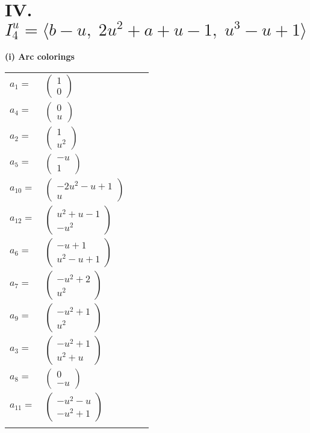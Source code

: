 \documentclass[1p]{elsarticle_modified}
\theoremstyle{definition}
\begin{document}
\centering \section*{IV. $I^u_{4}= \langle b- u,\;2 u^2+a+u-1,\;u^3- u+1 \rangle$}
\flushleft \textbf{(i) Arc colorings}\\
\begin{tabular}{m{7pt} m{180pt} m{7pt} m{180pt} }
\flushright $a_{1}=$&$\begin{pmatrix}1\\0\end{pmatrix}$ \\
\flushright $a_{4}=$&$\begin{pmatrix}0\\u\end{pmatrix}$ \\
\flushright $a_{2}=$&$\begin{pmatrix}1\\u^2\end{pmatrix}$ \\
\flushright $a_{5}=$&$\begin{pmatrix}- u\\1\end{pmatrix}$ \\
\flushright $a_{10}=$&$\begin{pmatrix}-2 u^2- u+1\\u\end{pmatrix}$ \\
\flushright $a_{12}=$&$\begin{pmatrix}u^2+u-1\\- u^2\end{pmatrix}$ \\
\flushright $a_{6}=$&$\begin{pmatrix}- u+1\\u^2- u+1\end{pmatrix}$ \\
\flushright $a_{7}=$&$\begin{pmatrix}- u^2+2\\u^2\end{pmatrix}$ \\
\flushright $a_{9}=$&$\begin{pmatrix}- u^2+1\\u^2\end{pmatrix}$ \\
\flushright $a_{3}=$&$\begin{pmatrix}- u^2+1\\u^2+u\end{pmatrix}$ \\
\flushright $a_{8}=$&$\begin{pmatrix}0\\- u\end{pmatrix}$ \\
\flushright $a_{11}=$&$\begin{pmatrix}- u^2- u\\- u^2+1\end{pmatrix}$\\&\end{tabular}
\end{document}
